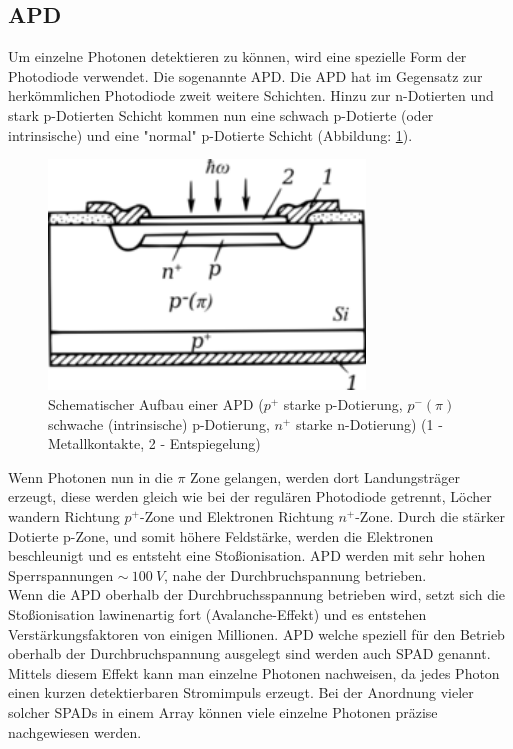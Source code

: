 \subsection{\acf{APD}}\label{subsec:apd}
Um einzelne Photonen detektieren zu können, wird eine spezielle Form der Photodiode verwendet. Die sogenannte \ac{APD}. Die \ac{APD} hat im Gegensatz zur herkömmlichen Photodiode zweit weitere Schichten. Hinzu zur n-Dotierten und stark p-Dotierten Schicht kommen nun eine schwach p-Dotierte (oder intrinsische) und eine "normal" p-Dotierte Schicht (Abbildung: \ref{apd}). 
\begin{figure}[H]
	\centering
	\includegraphics[width=0.75\textwidth]{images/GrundlagenLaserentfernungsmessung/APD}
	\caption{Schematischer Aufbau einer \ac{APD} \cite{APD_Scematic} ($p^+$ starke p-Dotierung, $p^- (\pi)$ schwache (intrinsische) p-Dotierung, $n^+$ starke n-Dotierung) (1 - Metallkontakte, 2 - Entspiegelung)}
	\label{apd}
\end{figure}
Wenn Photonen nun in die $\pi$ Zone gelangen, werden dort Landungsträger erzeugt, diese werden gleich wie bei der regulären Photodiode getrennt, Löcher wandern Richtung $p^+$-Zone und Elektronen Richtung $n^+$-Zone. Durch die stärker Dotierte p-Zone, und somit höhere Feldstärke, werden die Elektronen beschleunigt und es entsteht eine Stoßionisation. \ac{APD} werden mit sehr hohen Sperrspannungen $\sim \:100\:V$, nahe der Durchbruchspannung betrieben. \cite{SPAD_mamamatsu} \\
Wenn die \ac{APD} oberhalb der Durchbruchsspannung betrieben wird, setzt sich die Stoßionisation lawinenartig fort (Avalanche-Effekt) und es entstehen Verstärkungsfaktoren von einigen Millionen. \ac{APD} welche speziell für den Betrieb oberhalb der Durchbruchspannung ausgelegt sind werden auch \ac{SPAD} genannt. Mittels diesem Effekt kann man einzelne Photonen nachweisen, da jedes Photon einen kurzen detektierbaren Stromimpuls erzeugt. Bei der Anordnung vieler solcher \acp{SPAD} in einem Array können viele einzelne Photonen präzise nachgewiesen werden. \cite{SPAD_elmer}\\
